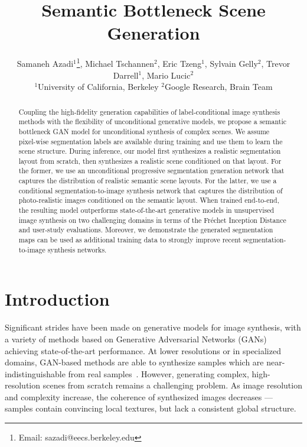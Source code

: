 \documentclass[10pt,twocolumn,letterpaper]{article}
\begin{document}
\title{Semantic Bottleneck Scene Generation}

\author{\quad Samaneh Azadi$^\text{1}$\thanks{Email: sazadi@eecs.berkeley.edu},
Michael Tschannen$^\text{2}$,
Eric Tzeng$^\text{1}$,
Sylvain Gelly$^\text{2}$,
Trevor Darrell$^\text{1}$,
Mario Lucic$^\text{2}$\\[0.2cm]
$^\text{1}$University of California, Berkeley \quad $^\text{2}$Google Research, Brain Team
}

\maketitle
\thispagestyle{empty}

\begin{abstract}
Coupling the high-fidelity generation capabilities of label-conditional image synthesis methods with the flexibility of unconditional generative models, we propose a semantic bottleneck GAN model for unconditional synthesis of complex scenes. We assume pixel-wise segmentation labels are available during training and use them to learn the scene structure. During inference, our model first synthesizes a realistic segmentation layout from scratch, then synthesizes a realistic scene conditioned on that layout. For the former, we use an unconditional progressive segmentation generation network that captures the distribution of realistic semantic scene layouts. For the latter, we use a conditional segmentation-to-image synthesis network that captures the distribution of photo-realistic images conditioned on the semantic layout. When trained end-to-end, the resulting model outperforms state-of-the-art generative models in unsupervised image synthesis on two challenging domains in terms of the Fr\'echet Inception Distance and user-study evaluations. Moreover, we demonstrate the generated segmentation maps can be used as additional training data to strongly improve recent segmentation-to-image synthesis networks.
\end{abstract}

\section{Introduction}
Significant strides have been made on generative models for image synthesis, with a variety of methods based on Generative Adversarial Networks (GANs) \cite{GAN} achieving state-of-the-art performance.
At lower resolutions or in specialized domains, GAN-based methods are able to synthesize samples which are near-indistinguishable from real samples~\cite{biggan}. However, generating complex, high-resolution scenes from scratch remains a challenging problem.
As image resolution and complexity increase, the coherence of synthesized images decreases --- samples contain convincing local textures, but lack a consistent global structure.
\end{document}
